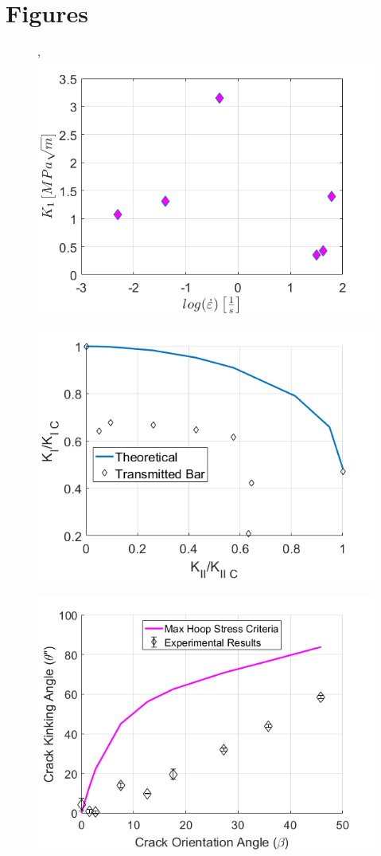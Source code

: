 \documentclass[12pt]{article}
\begin{document}
\section{Figures} %

\begin{figure}[H], 
	\centering
	\includegraphics[width=.67\textwidth,scale=1]{Goal1_b.png}
	\caption{}
	\label{fig:Goal1}
\end{figure}

\begin{figure}[H]
	\centering
	\includegraphics[width=.67\textwidth,scale=1]{Goal2.png}
	\caption{}
	\label{fig:Goal2}
\end{figure}

\begin{figure}[H]
	\centering
	\includegraphics[width=.67\textwidth,scale=1]{Goal3_b.png}
	\caption{}
	\label{fig:Goal3}
\end{figure}




\end{document}
